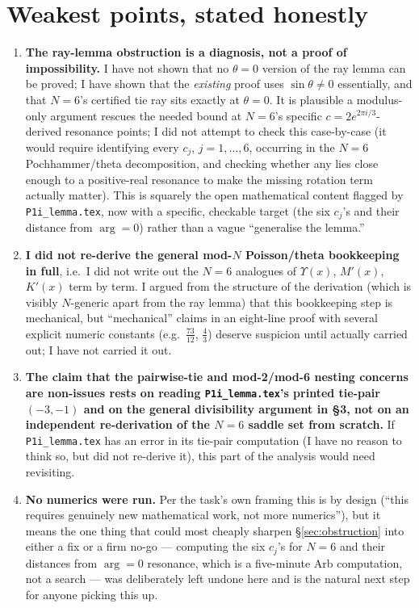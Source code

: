 \documentclass[11pt]{article}
\theoremstyle{plain}
\theoremstyle{remark}
\begin{document}
\section{Weakest points, stated honestly}
\label{sec:weak}
\begin{enumerate}
\item \textbf{The ray-lemma obstruction is a diagnosis, not a proof of impossibility.} I have not shown
that no $\theta=0$ version of the ray lemma can be proved; I have shown that the \emph{existing} proof
uses $\sin\theta\ne0$ essentially, and that $N=6$'s certified tie ray sits exactly at $\theta=0$. It is
plausible a modulus-only argument rescues the needed bound at $N=6$'s specific $c=2e^{2\pi i/3}$-derived
resonance points; I did not attempt to check this case-by-case (it would require identifying every $c_j$,
$j=1,\dots,6$, occurring in the $N=6$ Pochhammer/theta decomposition, and checking whether any lies close
enough to a positive-real resonance to make the missing rotation term actually matter). This is squarely
the open mathematical content flagged by \texttt{P1i\_lemma.tex}, now with a specific, checkable target
(the six $c_j$'s and their distance from $\arg=0$) rather than a vague ``generalise the lemma.''
\item \textbf{I did not re-derive the general mod-$N$ Poisson/theta bookkeeping in full}, i.e.\ I did not
write out the $N=6$ analogues of $\Upsilon(x)$, $M'(x)$, $K'(x)$ term by term. I argued from the structure
of the derivation (which is visibly $N$-generic apart from the ray lemma) that this bookkeeping step is
mechanical, but ``mechanical'' claims in an eight-line proof with several explicit numeric constants
(e.g.\ $\frac{73}{12}$, $\frac43$) deserve suspicion until actually carried out; I have not carried it out.
\item \textbf{The claim that the pairwise-tie and mod-2/mod-6 nesting concerns are non-issues rests on
reading \texttt{P1i\_lemma.tex}'s printed tie-pair $(-3,-1)$ and on the general divisibility argument in
\S3, not on an independent re-derivation of the $N=6$ saddle set from scratch.} If \texttt{P1i\_lemma.tex}
has an error in its tie-pair computation (I have no reason to think so, but did not re-derive it), this
part of the analysis would need revisiting.
\item \textbf{No numerics were run.} Per the task's own framing this is by design (``this requires
genuinely new mathematical work, not more numerics''), but it means the one thing that could most cheaply
sharpen \S\ref{sec:obstruction} into either a fix or a firm no-go --- computing the six $c_j$'s for $N=6$
and their distances from $\arg=0$ resonance, which is a five-minute Arb computation, not a search --- was
deliberately left undone here and is the natural next step for anyone picking this up.
\end{enumerate}
\end{document}
